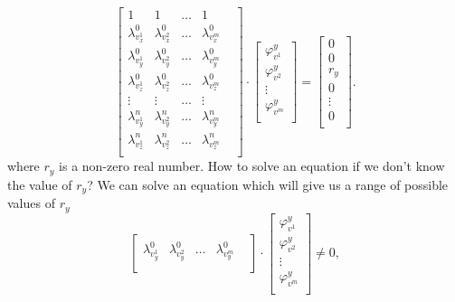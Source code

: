\begin{equation}\label{eq:linear:affine}
  \begin{bmatrix}
    1                 & 1                 & \dots & 1                 & \\
    \lambda^0_{v^1_x} & \lambda^0_{v^2_x} & \dots & \lambda^0_{v^m_x} & \\
    \lambda^0_{v^1_y} & \lambda^0_{v^2_y} & \dots & \lambda^0_{v^m_y} & \\
    \lambda^0_{v^1_z} & \lambda^0_{v^2_z} & \dots & \lambda^0_{v^m_z} & \\
    \vdots            & \vdots            & \dots & \vdots            & \\
    \lambda^n_{v^1_y} & \lambda^n_{v^2_y} & \dots & \lambda^n_{v^m_y} & \\
    \lambda^n_{v^1_z} & \lambda^n_{v^2_z} & \dots & \lambda^n_{v^m_z} & \\
  \end{bmatrix}
  \cdot
  \begin{bmatrix}
    \varphi^y_{v^1} \\
    \varphi^y_{v^2} \\
    \vdots          \\
    \varphi^y_{v^m} \\
  \end{bmatrix}
  =
  \begin{bmatrix}
    0       \\
    0       \\
    r_y     \\
    0       \\
    \vdots  \\
    0       \\
  \end{bmatrix}.
\end{equation}
where $r_y$ is a non-zero real number.
How to solve an equation if we don't know the value of $r_y$?
We can solve an equation which will give us a range of possible values of $r_y$
\begin{equation*}
  \begin{bmatrix}
    \lambda^0_{v^1_y} & \lambda^0_{v^2_y} & \dots & \lambda^0_{v^m_y} & \\
  \end{bmatrix}
  \cdot
  \begin{bmatrix}
    \varphi^y_{v^1} \\
    \varphi^y_{v^2} \\
    \vdots          \\
    \varphi^y_{v^m} \\
  \end{bmatrix}
  \neq 0,
\end{equation*}
